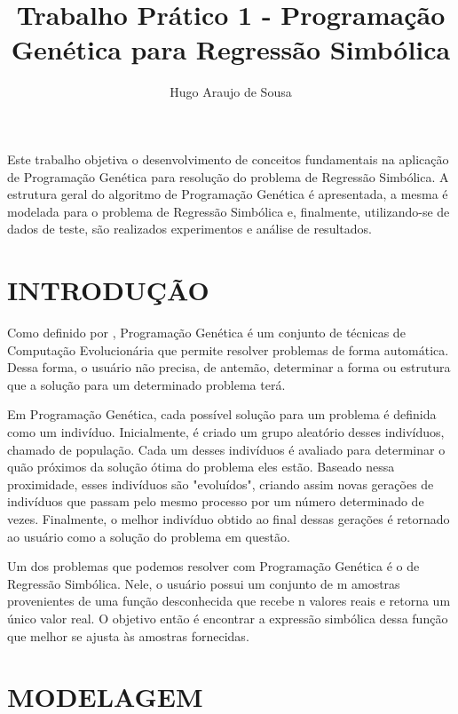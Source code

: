 \documentclass[12pt]{article}
\title{Trabalho Prático 1 - Programação Genética para Regressão Simbólica}
\author{Hugo Araujo de Sousa}
\begin{document}
 

\maketitle
     
\begin{resumo} 
  Este trabalho objetiva o desenvolvimento de conceitos fundamentais na
  aplicação de Programação Genética para resolução do problema de Regressão
  Simbólica. A estrutura geral do algoritmo de Programação Genética é
  apresentada, a mesma é modelada para o problema de Regressão Simbólica
  e, finalmente, utilizando-se de dados de teste, são realizados experimentos e
  análise de resultados.
\end{resumo}

\section{INTRODUÇÃO}

Como definido por \cite{plmgp:08}, Programação Genética é um conjunto de técnicas
de Computação Evolucionária que permite resolver problemas de forma automática.
Dessa forma, o usuário não precisa, de antemão, determinar a forma ou estrutura 
que a solução para um determinado problema terá.

Em Programação Genética, cada possível solução para um problema é definida como um
indivíduo. Inicialmente, é criado um grupo aleatório desses indivíduos, chamado de
população. Cada um desses indivíduos é avaliado para determinar o quão próximos da
solução ótima do problema eles estão. Baseado nessa proximidade, esses indivíduos
são "evoluídos", criando assim novas gerações de indivíduos que passam pelo mesmo
processo por um número determinado de vezes. Finalmente, o melhor indivíduo obtido
ao final dessas gerações é retornado ao usuário como a solução do problema em questão.

Um dos problemas que podemos resolver com Programação Genética é o de Regressão Simbólica.
Nele, o usuário possui um conjunto de m amostras provenientes de uma função desconhecida
que recebe n valores reais e retorna um único valor real. O objetivo então é encontrar a
expressão simbólica dessa função que melhor se ajusta às amostras fornecidas.

\section{MODELAGEM} \label{sec:model}
\end{document}
